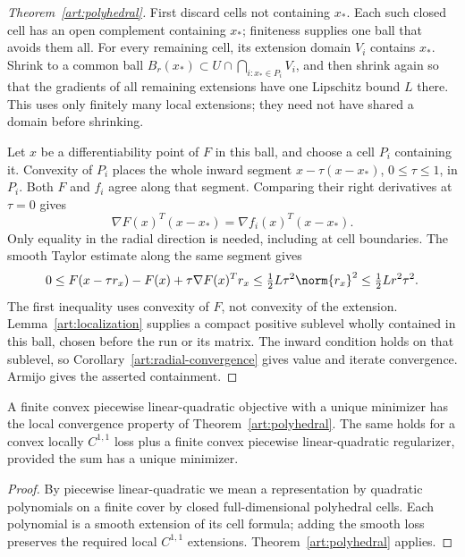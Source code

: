 

\begin{proof}[Theorem~\ref{art:polyhedral}]
First discard cells not containing $x_*$. Each such closed cell has an open
complement containing $x_*$; finiteness supplies one ball that avoids them all.
For every remaining cell, its extension domain $V_i$ contains $x_*$.
Shrink to a common ball $B_r(x_*)\subset U\cap\bigcap_{i:x_*\in P_i}V_i$,
and then shrink again so that the gradients of all remaining extensions have
one Lipschitz bound $L$ there. This uses only finitely many local extensions;
they need not have shared a domain before shrinking.

Let $x$ be a differentiability point of $F$ in this ball, and choose a cell
$P_i$ containing it. Convexity of $P_i$ places the whole inward segment
$x-\tau(x-x_*)$, $0\le\tau\le1$, in $P_i$. Both $F$ and $f_i$ agree
along that segment. Comparing their right derivatives at $\tau=0$ gives
\[
 \nabla F(x)^T(x-x_*)=\nabla f_i(x)^T(x-x_*).
\]
Only equality in the radial direction is needed, including at cell boundaries.
The smooth Taylor estimate along the same segment gives
\[
 0\le F(x-\tau r_x)-F(x)+\tau\nabla F(x)^Tr_x
       \le\tfrac12L\tau^2\norm{r_x}^2
       \le\tfrac12Lr^2\tau^2.
\]
The first inequality uses convexity of $F$, not convexity of the extension.
Lemma~\ref{art:localization} supplies a compact positive sublevel wholly
contained in this ball, chosen before the run or its matrix. The inward
condition holds on that sublevel, so Corollary~\ref{art:radial-convergence}
gives value and iterate convergence. Armijo gives the asserted containment.
\end{proof}

\begin{corollary}\label{art:plq}
A finite convex piecewise linear-quadratic objective with a unique minimizer
has the local convergence property of Theorem~\ref{art:polyhedral}.
The same holds for a convex locally $C^{1,1}$ loss plus a finite convex
piecewise linear-quadratic regularizer, provided the sum has a unique minimizer.
\end{corollary}
\begin{proof}
By piecewise linear-quadratic we mean a representation by quadratic polynomials
on a finite cover by closed full-dimensional polyhedral cells. Each polynomial is a smooth
extension of its cell formula; adding the smooth loss preserves the required
local $C^{1,1}$ extensions. Theorem~\ref{art:polyhedral} applies.
\end{proof}

